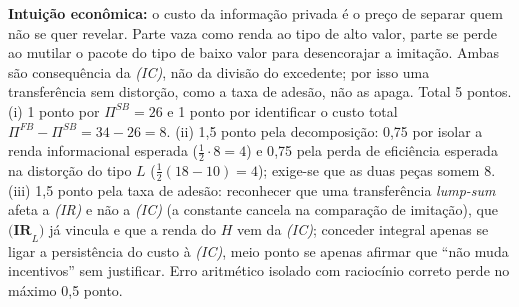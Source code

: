 \begin{solucao}
\textbf{Intuição econômica:} o custo da informação privada é o preço de separar quem não se quer revelar. Parte vaza como renda ao tipo de alto valor, parte se perde ao mutilar o pacote do tipo de baixo valor para desencorajar a imitação. Ambas são consequência da \emph{(IC)}, não da divisão do excedente; por isso uma transferência sem distorção, como a taxa de adesão, não as apaga.
\rubricalabel
Total 5 pontos. (i) 1 ponto por $\Pi^{SB}=26$ e 1 ponto por identificar o custo total $\Pi^{FB}-\Pi^{SB}=34-26=8$. (ii) 1{,}5 ponto pela decomposição: 0{,}75 por isolar a renda informacional esperada ($\tfrac{1}{2}\cdot 8 = 4$) e 0{,}75 pela perda de eficiência esperada na distorção do tipo $L$ ($\tfrac{1}{2}(18-10)=4$); exige-se que as duas peças somem $8$. (iii) 1{,}5 ponto pela taxa de adesão: reconhecer que uma transferência \emph{lump-sum} afeta a \emph{(IR)} e não a \emph{(IC)} (a constante cancela na comparação de imitação), que $\textbf{(IR}_L\textbf{)}$ já vincula e que a renda do $H$ vem da \emph{(IC)}; conceder integral apenas se ligar a persistência do custo à \emph{(IC)}, meio ponto se apenas afirmar que ``não muda incentivos'' sem justificar. Erro aritmético isolado com raciocínio correto perde no máximo 0{,}5 ponto.
\end{solucao}
